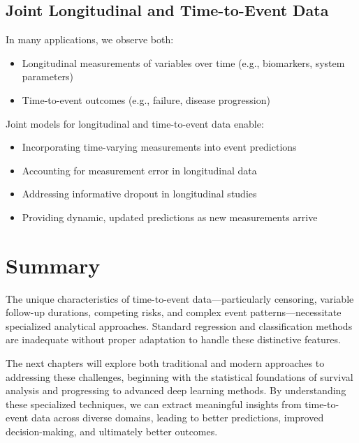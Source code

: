 \subsection{Joint Longitudinal and Time-to-Event Data}

In many applications, we observe both:
\begin{itemize}
\item Longitudinal measurements of variables over time (e.g., biomarkers, system parameters)
\item Time-to-event outcomes (e.g., failure, disease progression)
\end{itemize}

Joint models for longitudinal and time-to-event data enable:
\begin{itemize}
\item Incorporating time-varying measurements into event predictions
\item Accounting for measurement error in longitudinal data
\item Addressing informative dropout in longitudinal studies
\item Providing dynamic, updated predictions as new measurements arrive
\end{itemize}

\section{Summary}

The unique characteristics of time-to-event data—particularly censoring, variable follow-up durations, competing risks, and complex event patterns—necessitate specialized analytical approaches. Standard regression and classification methods are inadequate without proper adaptation to handle these distinctive features.

The next chapters will explore both traditional and modern approaches to addressing these challenges, beginning with the statistical foundations of survival analysis and progressing to advanced deep learning methods. By understanding these specialized techniques, we can extract meaningful insights from time-to-event data across diverse domains, leading to better predictions, improved decision-making, and ultimately better outcomes.
